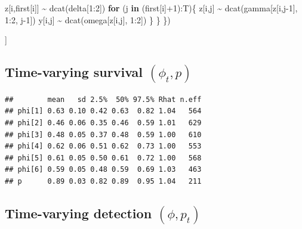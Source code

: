 \documentclass[
  12pt,
]{krantz}
\newenvironment{Shaded}{\begin{snugshade}}{\end{snugshade}}
\newcommand{\ControlFlowTok}[1]{\textcolor[rgb]{0.13,0.29,0.53}{\textbf{#1}}}
\newcommand{\DecValTok}[1]{\textcolor[rgb]{0.00,0.00,0.81}{#1}}
\newcommand{\FunctionTok}[1]{\textcolor[rgb]{0.00,0.00,0.00}{#1}}
\newcommand{\NormalTok}[1]{#1}
\newcommand{\SpecialCharTok}[1]{\textcolor[rgb]{0.00,0.00,0.00}{#1}}
\begin{document}
\begin{Shaded}
\begin{Highlighting}[]
\NormalTok{    z[i,first[i]] }\SpecialCharTok{\textasciitilde{}} \FunctionTok{dcat}\NormalTok{(delta[}\DecValTok{1}\SpecialCharTok{:}\DecValTok{2}\NormalTok{])}
    \ControlFlowTok{for}\NormalTok{ (j }\ControlFlowTok{in}\NormalTok{ (first[i]}\SpecialCharTok{+}\DecValTok{1}\NormalTok{)}\SpecialCharTok{:}\NormalTok{T)\{}
\NormalTok{      z[i,j] }\SpecialCharTok{\textasciitilde{}} \FunctionTok{dcat}\NormalTok{(gamma[z[i,j}\DecValTok{{-}1}\NormalTok{], }\DecValTok{1}\SpecialCharTok{:}\DecValTok{2}\NormalTok{, j}\DecValTok{{-}1}\NormalTok{])}
\NormalTok{      y[i,j] }\SpecialCharTok{\textasciitilde{}} \FunctionTok{dcat}\NormalTok{(omega[z[i,j], }\DecValTok{1}\SpecialCharTok{:}\DecValTok{2}\NormalTok{])}
\NormalTok{    \}}
\NormalTok{  \}}
\NormalTok{\})}
\end{Highlighting}
\end{Shaded}

{]}

\hypertarget{time-varying-survival-phi_t-p-1}{%
\subsection{\texorpdfstring{Time-varying survival \((\phi_t, p)\)}{Time-varying survival (\textbackslash phi\_t, p)}}\label{time-varying-survival-phi_t-p-1}}

\begin{verbatim}
##        mean   sd 2.5%  50% 97.5% Rhat n.eff
## phi[1] 0.63 0.10 0.42 0.63  0.82 1.04   564
## phi[2] 0.46 0.06 0.35 0.46  0.59 1.01   629
## phi[3] 0.48 0.05 0.37 0.48  0.59 1.00   610
## phi[4] 0.62 0.06 0.51 0.62  0.73 1.00   553
## phi[5] 0.61 0.05 0.50 0.61  0.72 1.00   568
## phi[6] 0.59 0.05 0.48 0.59  0.69 1.03   463
## p      0.89 0.03 0.82 0.89  0.95 1.04   211
\end{verbatim}

\hypertarget{time-varying-detection-phi-p_t}{%
\subsection{\texorpdfstring{Time-varying detection \((\phi, p_t)\)}{Time-varying detection (\textbackslash phi, p\_t)}}\label{time-varying-detection-phi-p_t}}
\end{document}
